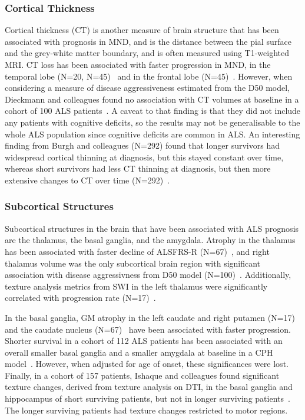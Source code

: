 \subsubsection*{Cortical Thickness}
Cortical thickness (CT) is another measure of brain structure that has been associated with prognosis in MND, and is the distance between the pial surface and the grey-white matter boundary, and is often measured using T1-weighted MRI.
CT loss has been associated with faster progression in MND, in the temporal lobe (N=20, N=45)~\cite{dambrosioFrontotemporalCorticalThinning2014, verstraeteStructuralMRIReveals2012} and in the frontal lobe (N=45)~\cite{verstraeteStructuralMRIReveals2012}.
However, when considering a measure of disease aggressiveness estimated from the D50 model, Dieckmann and colleagues found no association with CT volumes at baseline in a cohort of 100 ALS patients~\cite{dieckmannCorticalSubcorticalGrey2022}.
A caveat to that finding is that they did not include any patients with cognitive deficits, so the results may not be generalisable to the whole ALS population since cognitive deficits are common in ALS.
An interesting finding from Burgh and colleagues (N=292) found that longer survivors had widespread cortical thinning at diagnosis, but this stayed constant over time, whereas short survivors had less CT thinning at diagnosis, but then more extensive changes to CT over time (N=292)~\cite{burghMultimodalLongitudinalStudy2020}.

\subsubsection*{Subcortical Structures}
Subcortical structures in the brain that have been associated with ALS prognosis are the thalamus, the basal ganglia, and the amygdala.
Atrophy in the thalamus has been associated with faster decline of ALSFRS-R (N=67)~\cite{sendaStructuralMRICorrelates2017}, and right thalamus volume was the only subcortical brain region with significant association with disease aggressivness from D50 model (N=100)~\cite{dieckmannCorticalSubcorticalGrey2022}.
Additionally, texture analysis metrics from SWI in the left thalamus were significantly correlated with progression rate (N=17)~\cite{johnsQuantifyingChangesSusceptibility2019}.

In the basal ganglia, GM atrophy in the left caudate and right putamen (N=17)~\cite{agostaLongitudinalAssessmentGrey2009} and the caudate nucleus (N=67)~\cite{sendaStructuralMRICorrelates2017} have been associated with faster progression.
Shorter survival in a cohort of 112 ALS patients has been associated with an overall smaller basal ganglia and a smaller amygdala at baseline in a CPH model~\cite{westenengSubcorticalStructuresAmyotrophic2015}. However, when adjusted for age of onset, these significances were lost.
Finally, in a cohort of 157 patients, Ishaque and colleagues found significant texture changes, derived from texture analysis on DTI, in the basal ganglia and hippocampus of short surviving patients, but not in longer surviving patients~\cite{ishaqueEvaluatingCerebralCorrelates2018}.
The longer surviving patients had texture changes restricted to motor regions.

